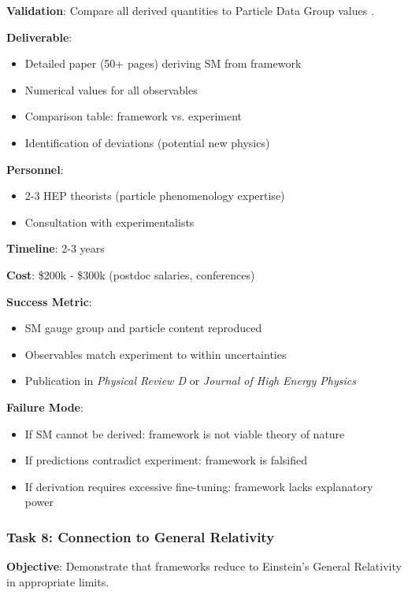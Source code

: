 \textbf{Validation}:
Compare all derived quantities to Particle Data Group values \cite{pdg2024}.

\textbf{Deliverable}:
\begin{itemize}
    \item Detailed paper (50+ pages) deriving SM from framework
    \item Numerical values for all observables
    \item Comparison table: framework vs. experiment
    \item Identification of deviations (potential new physics)
\end{itemize}

\textbf{Personnel}:
\begin{itemize}
    \item 2-3 HEP theorists (particle phenomenology expertise)
    \item Consultation with experimentalists
\end{itemize}

\textbf{Timeline}: 2-3 years

\textbf{Cost}: \$200k - \$300k (postdoc salaries, conferences)

\textbf{Success Metric}:
\begin{itemize}
    \item SM gauge group and particle content reproduced
    \item Observables match experiment to within uncertainties
    \item Publication in \textit{Physical Review D} or \textit{Journal of High Energy Physics}
\end{itemize}

\textbf{Failure Mode}:
\begin{itemize}
    \item If SM cannot be derived: framework is not viable theory of nature
    \item If predictions contradict experiment: framework is falsified
    \item If derivation requires excessive fine-tuning: framework lacks explanatory power
\end{itemize}

\subsubsection{Task 8: Connection to General Relativity}

\textbf{Objective}: Demonstrate that frameworks reduce to Einstein's General Relativity in appropriate limits.

